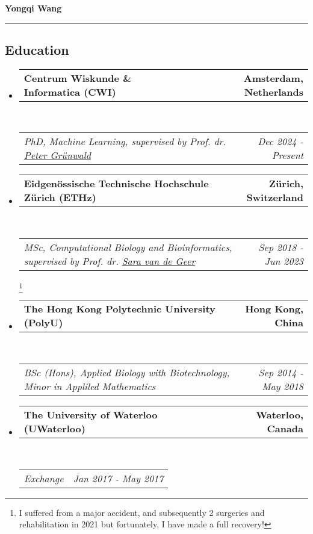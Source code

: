 \documentclass[10pt,a4paper]{article}
\makeatletter
\newcommand{\headerrow}[2]
{\begin{tabular*}{\linewidth}{l@{\extracolsep{\fill}}r}
	#1 &
	#2 \\
\end{tabular*}}
\newcommand{\urlPeter}{https://safestatistics.com/}
\newcommand{\urlSara}{https://stat.ethz.ch/~vsara/}
\makeatother
\begin{document}

\begin{center}
	{\LARGE \textbf{Yongqi Wang}}
\end{center}


\hrule
\vspace{-1em}
\subsection*{Education}

\begin{itemize}
	\parskip=0.1em

	\item
	      \headerrow
	      {\textbf{Centrum Wiskunde \& Informatica (CWI)}}
	      {\textbf{Amsterdam, Netherlands}}
	      \\
	      \headerrow
	      {\emph{PhD, Machine Learning, supervised by Prof. dr.
			      \href{\urlPeter}{Peter Grünwald}}}
	      {\emph{Dec 2024 - Present}}

	\item
	      \headerrow
	      {\textbf{Eidgenössische Technische Hochschule Zürich (ETHz)}}
	      {\textbf{Zürich, Switzerland}}
	      \\
	      \headerrow
	      {\emph{MSc, Computational Biology and Bioinformatics,
			      supervised by Prof. dr. \href{\urlSara}{Sara van de Geer}}}
	      {\emph{Sep 2018 - Jun 2023}}\footnote{
		      I suffered from a major accident, and
		      subsequently 2 surgeries and rehabilitation in 2021 but
		      fortunately, I have made a full recovery!
	      }

	\item
	      \headerrow
	      {\textbf{The Hong Kong Polytechnic University (PolyU)}}
	      {\textbf{Hong Kong, China}}
	      \\
	      \headerrow
	      {\emph{BSc (Hons), Applied Biology with Biotechnology,
			      Minor in Appliled Mathematics}}
	      {\emph{Sep 2014 - May 2018}}

	\item
	      \headerrow
	      {\textbf{The University of Waterloo (UWaterloo)}}
	      {\textbf{Waterloo, Canada}}
	      \\
	      \headerrow
	      {\emph{Exchange}}
	      {\emph{Jan 2017 - May 2017}}

\end{itemize}
\end{document}
